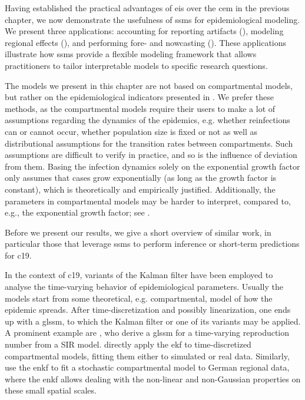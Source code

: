 \newpage
Having established the practical advantages of \gls{eis} over the \gls{cem} in the previous chapter, we now demonstrate the usefulness of \glspl{ssm} for epidemiological modeling. We present three applications: accounting for reporting artifacts (), modeling regional effects (), and performing fore- and nowcasting (). These applications illustrate how \glspl{ssm} provide a flexible modeling framework that allows practitioners to tailor interpretable models to specific research questions.

The models we present in this chapter are not based on compartmental models, but rather on the epidemiological indicators presented in . We prefer these methods, as the compartmental models require their users to make a lot of assumptions regarding the dynamics of the epidemics, e.g. whether reinfections can or cannot occur, whether population size is fixed or not as well as distributional assumptions for the transition rates between compartments. 
Such assumptions are difficult to verify in practice, and so is the influence of deviation from them. Basing the infection dynamics solely on the exponential growth factor only assumes that cases grow exponentially (as long as the growth factor is constant), which is theoretically and empirically justified. 
Additionally, the parameters in compartmental models may be harder to interpret, compared to, e.g., the exponential growth factor; see .

Before we present our results, we give a short overview of similar work, in particular those that leverage \glspl{ssm} to perform inference or short-term predictions for \gls{c19}.

In the context of \gls{c19}, variants of the Kalman filter have been employed to analyse the time-varying behavior of epidemiological parameters. Usually the models start from some theoretical, e.g. compartmental, model of how the epidemic spreads. After time-discretization and possibly linearization, one ends up with a \gls{glssm}, to which the Kalman filter or one of its variants may be applied. 
A prominent example are \citet{Arroyo-Marioli2021Tracking}, who derive a \gls{glssm} for a time-varying reproduction number from a SIR model.
\citep{Zhu2021Extended,Song2021Maximum} directly apply the \gls{ekf} to time-discretized compartmental models, fitting them either to simulated \citep{Zhu2021Extended} or real \citep{Song2021Maximum} data. Similarly, \citep{Engbert2020Sequential} use the \gls{enkf} to fit a stochastic compartmental model to German regional data, where the \gls{enkf} allows dealing with the non-linear and non-Gaussian properties on these small spatial scales.

